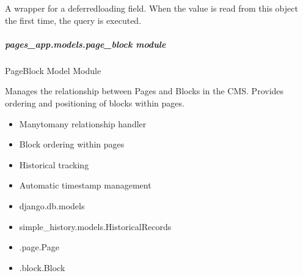\documentclass[letterpaper,10pt,english]{sphinxmanual}
\begin{document}
\begin{fulllineitems}
\begin{fulllineitems}
\end{fulllineitems}


\begin{fulllineitems}
\label{\detokenize{pages_app.models:id19}}
\pysigstartsignatures
\pysigline
{}
\pysigstopsignatures
\sphinxAtStartPar
A wrapper for a deferred\sphinxhyphen{}loading field. When the value is read from this
object the first time, the query is executed.

\end{fulllineitems}


\end{fulllineitems}



\subparagraph{pages\_app.models.page\_block module}
\label{\detokenize{pages_app.models:module-pages_app.models.page_block}}\label{\detokenize{pages_app.models:pages-app-models-page-block-module}}
\sphinxAtStartPar
PageBlock Model Module

\sphinxAtStartPar
Manages the relationship between Pages and Blocks in the CMS.
Provides ordering and positioning of blocks within pages.
\begin{description}
\begin{itemize}
\item {} 
\sphinxAtStartPar
Many\sphinxhyphen{}to\sphinxhyphen{}many relationship handler

\item {} 
\sphinxAtStartPar
Block ordering within pages

\item {} 
\sphinxAtStartPar
Historical tracking

\item {} 
\sphinxAtStartPar
Automatic timestamp management

\end{itemize}

\begin{itemize}
\item {} 
\sphinxAtStartPar
django.db.models

\item {} 
\sphinxAtStartPar
simple\_history.models.HistoricalRecords

\item {} 
\sphinxAtStartPar
.page.Page

\item {} 
\sphinxAtStartPar
.block.Block

\end{itemize}

\end{description}
\end{document}
